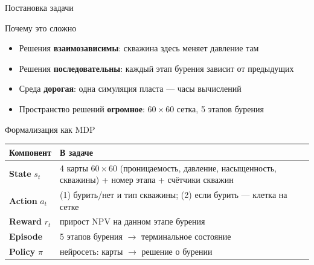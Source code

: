 \documentclass[aspectratio=169,12pt,t,compress]{beamer}
\begin{document}

\begin{frame}{Постановка задачи}
\end{frame}

\begin{frame}{Почему это сложно}
	\begin{itemize}
		\item Решения \textbf{взаимозависимы}: скважина здесь меняет давление там
		\item Решения \textbf{последовательны}: каждый этап бурения зависит от предыдущих
		\item Среда \textbf{дорогая}: одна симуляция пласта --- часы вычислений
		\item Пространство решений \textbf{огромное}: $60 \times 60$ сетка, 5 этапов бурения
	\end{itemize}
\end{frame}

\begin{frame}{Формализация как MDP}
	\centering
	\small
	\begin{tabular}{|p{2.5cm}|p{9cm}|}
		\hline
		\textbf{Компонент}    & \textbf{В задаче}                                                                                         \\
		\hline
		\textbf{State} $s_t$  & 4 карты $60{\times}60$ (проницаемость, давление, насыщенность, скважины) + номер этапа + счётчики скважин \\
		\hline
		\textbf{Action} $a_t$ & (1) бурить/нет и тип скважины; (2) если бурить --- клетка на сетке                                        \\
		\hline
		\textbf{Reward} $r_t$ & прирост NPV на данном этапе бурения                                                                       \\
		\hline
		\textbf{Episode}      & 5 этапов бурения $\to$ терминальное состояние                                                             \\
		\hline
		\textbf{Policy} $\pi$ & нейросеть: карты $\to$ решение о бурении                                                                  \\
		\hline
	\end{tabular}
\end{frame}
\end{document}
